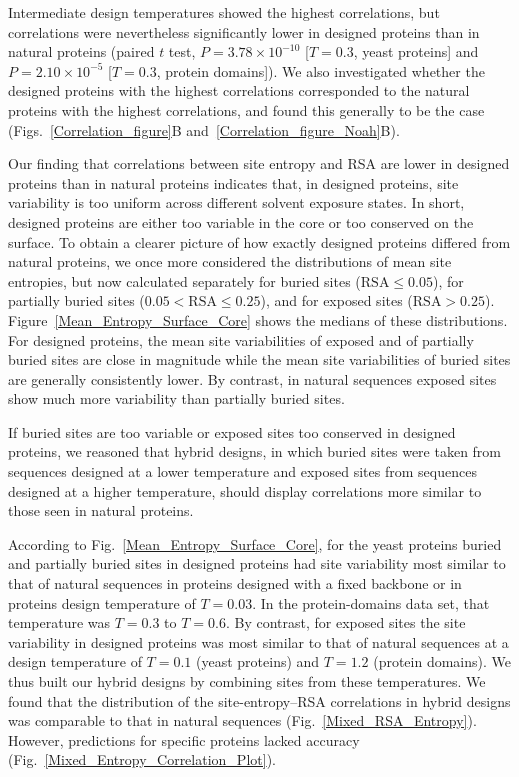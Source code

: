 \documentclass[12pt]{article}
\begin{document}
Intermediate design temperatures showed the highest correlations, but correlations were nevertheless significantly lower in designed proteins than in natural proteins (paired $t$ test, $P=3.78\times 10^{-10}$ [$T=0.3$, yeast proteins] and $P= 2.10\times 10^{-5}$ [$T=0.3$, protein domains]).  We also investigated whether the designed proteins with the highest correlations corresponded to the natural proteins with the highest correlations, and found this generally to be the case (Figs.~\ref{Correlation_figure}B and~\ref{Correlation_figure_Noah}B).

Our finding that correlations between site entropy and RSA are lower in designed proteins than in natural proteins indicates that, in designed proteins, site variability is too uniform across different solvent exposure states. In short, designed proteins are either too variable in the core or too conserved on the surface. To obtain a clearer picture of how exactly designed proteins differed from natural proteins, we once more considered the distributions of mean site entropies, but now calculated separately for buried sites ($\text{RSA}\leq0.05$), for partially buried sites ($0.05<\text{RSA}\leq0.25$), and for exposed sites ($\text{RSA}>0.25$). Figure~\ref{Mean_Entropy_Surface_Core} shows the medians of these distributions. For designed proteins, the mean site variabilities of exposed and of partially buried sites are close in magnitude while the mean site variabilities of buried sites are generally consistently lower. By contrast, in natural sequences exposed sites show much more variability than partially buried sites.

If buried sites are too variable or exposed sites too conserved in designed proteins, we reasoned that hybrid designs, in which buried sites were taken from sequences designed at a lower temperature and exposed sites from sequences designed at a higher temperature, should display correlations more similar to those seen in natural proteins. 

According to Fig.~\ref{Mean_Entropy_Surface_Core}, for the yeast proteins buried and partially buried sites in designed proteins had site variability most similar to that of natural sequences in proteins designed with a fixed backbone or in proteins design temperature of $T=0.03$. In the protein-domains data set, that temperature was $T=0.3$ to $T = 0.6$.  By contrast, for exposed sites the site variability in designed proteins was most similar to that of natural sequences at a design temperature of $T= 0.1$ (yeast proteins) and $T  = 1.2$ (protein domains).  We thus built our hybrid designs by combining sites from these temperatures. We found that the distribution of the site-entropy--RSA correlations in hybrid designs was comparable to that in natural sequences (Fig.~\ref{Mixed_RSA_Entropy}). However, predictions for specific proteins lacked accuracy (Fig.~\ref{Mixed_Entropy_Correlation_Plot}).
\end{document}
